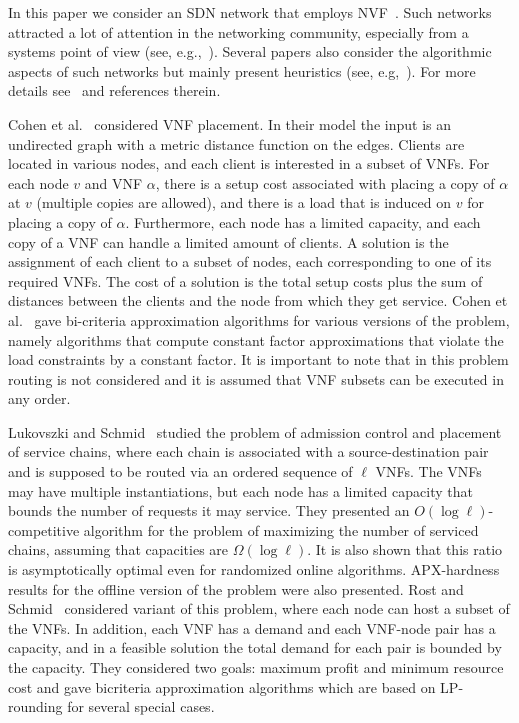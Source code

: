 In this paper we consider an SDN network that employs
NVF~\cite{SDN-NFV15}.  Such networks attracted a lot of attention in
the networking community, especially from a systems point of view
(see, e.g.,~\cite{GVPGKDA14,HVSBFTF15}).  Several papers also consider
the algorithmic aspects of such networks but mainly present heuristics
(see, e.g,~\cite{soule2014merlin}).  
For more details see~\cite{ERS16} and references therein.

Cohen et al.~\cite{CLNR15} considered VNF placement.  In their model
the input is an undirected graph with a metric distance function on
the edges.  Clients are located in various nodes, and each client is
interested in a subset of VNFs.  For each node $v$ and VNF $\alpha$,
there is a setup cost associated with placing a copy of $\alpha$ at
$v$ (multiple copies are allowed), and there is a load that is induced
on $v$ for placing a copy of $\alpha$.  Furthermore, each node has a
limited capacity, and each copy of a VNF can handle a limited amount
of clients.  A solution is the assignment of each client to a subset
of nodes, each corresponding to one of its required VNFs.  The cost of
a solution is the total setup costs plus the sum of distances between
the clients and the node from which they get service.
%
Cohen et al.~\cite{CLNR15} gave bi-criteria approximation algorithms
for various versions of the problem, namely algorithms that compute
constant factor approximations that violate the load constraints by a
constant factor.
%
It is important to note that in this problem routing is not considered
and it is assumed that VNF subsets can be executed in any order.

Lukovszki and Schmid~\cite{LukovszkiSchmid15} studied the problem of
admission control and placement of service chains, where each chain is
associated with a source-destination pair and is supposed to be routed
via an ordered sequence of $\ell$ VNFs.  The VNFs may have multiple
instantiations, but each node has a limited capacity that bounds the
number of requests it may service.
%
They presented an $O(\log \ell)$-competitive algorithm for the problem
of maximizing the number of serviced chains, assuming that capacities
are $\Omega(\log \ell)$.
It is also shown that this ratio is asymptotically optimal even for
randomized online algorithms.  APX-hardness results for the offline
version of the problem were also presented.
%
Rost and Schmid~\cite{RostSchmid16} considered variant of this
problem, where each node can host a subset of the VNFs.  In addition,
each VNF has a demand and each VNF-node pair has a capacity, and in a
feasible solution the total demand for each pair is bounded by the
capacity.  They considered two goals: maximum profit and minimum
resource cost and gave bicriteria approximation algorithms which are
based on LP-rounding for several special cases.

